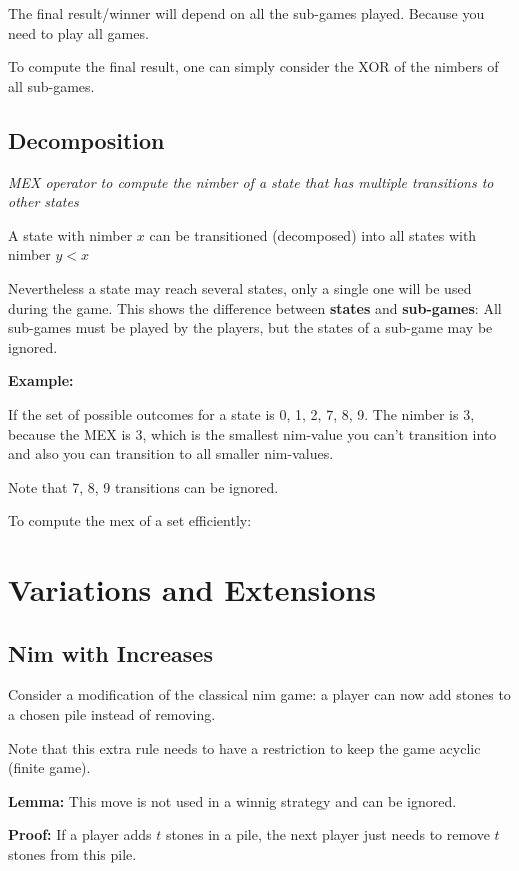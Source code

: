 The final result/winner will depend on all the sub-games played. Because you need to play all games.

To compute the final result, one can simply consider the XOR of the nimbers of all sub-games.

\subsection{Decomposition}

\textit{MEX operator to compute the nimber of a state that has multiple transitions to other states}

A state with nimber $x$ can be transitioned (decomposed) into all states with nimber $ y < x $

Nevertheless a state may reach several states, only a single one will be used during the game.
This shows the difference between \textbf{states} and \textbf{sub-games}: All sub-games must be played
by the players, but the states of a sub-game may be ignored. 

\textbf{Example:}

If the set of possible outcomes for a state is {0, 1, 2, 7, 8, 9}. 
The nimber is 3, because the MEX is 3, which is the smallest nim-value you can't transition into 
and also you can transition to all smaller nim-values.

Note that {7, 8, 9} transitions can be ignored.

To compute the mex of a set efficiently:


\section{Variations and Extensions}

\subsection{Nim with Increases}

Consider a modification of the classical nim game: a player can now add stones to a chosen pile instead of removing.

Note that this extra rule needs to have a restriction to keep the game acyclic (finite game).

\textbf{Lemma:} This move is not used in a winnig strategy and can be ignored.

\textbf{Proof:} If a player adds $t$ stones in a pile, 
the next player just needs to remove $t$ stones from this pile. 


